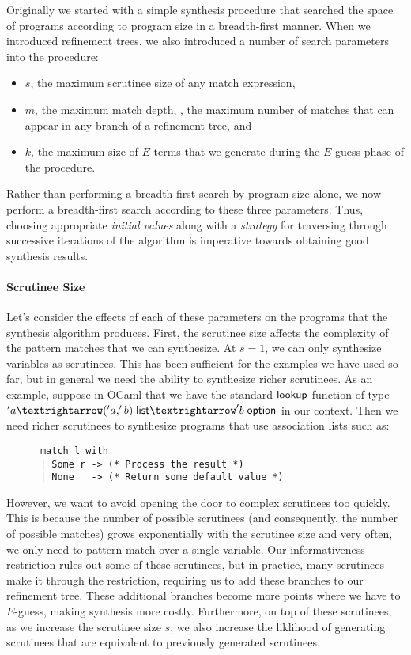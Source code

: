 Originally we started with a simple synthesis procedure that searched the space of programs according to program size in a breadth-first manner.
When we introduced refinement trees, we also introduced a number of search parameters into the procedure:
\begin{itemize}
  \item $s$, the maximum scrutinee size of any match expression,
  \item $m$, the maximum match depth, \ie, the maximum number of matches that can appear in any branch of a refinement tree, and
  \item $k$, the maximum size of $E$-terms that we generate during the $E$-guess phase of the procedure.
\end{itemize}
Rather than performing a breadth-first search by program size alone, we now perform a breadth-first search according to these three parameters.
Thus, choosing appropriate \emph{initial values} along with a \emph{strategy} for traversing through successive iterations of the algorithm is imperative towards obtaining good synthesis results.

\paragraph{Scrutinee Size}
Let's consider the effects of each of these parameters on the programs that the synthesis algorithm produces.
First, the scrutinee size affects the complexity of the pattern matches that we can synthesize.
At $s = 1$, we can only synthesize variables as scrutinees.
This has been sufficient for the examples we have used so far, but in general we need the ability to synthesize richer scrutinees.
As an example, suppose in OCaml that we have the standard $\mathsf{lookup}$ function of type $'a → ('a, 'b)\;\mlist → 'b\;\mkwd{option}$ in our context.
Then we need richer scrutinees to synthesize programs that use association lists such as:

\begin{center}
  \begin{minipage}{0.75\textwidth}
    \begin{lstlisting}
      match l with
      | Some r -> (* Process the result *)
      | None   -> (* Return some default value *)
    \end{lstlisting}
  \end{minipage}
\end{center}

However, we want to avoid opening the door to complex scrutinees too quickly.
This is because the number of possible scrutinees (and consequently, the number of possible matches) grows exponentially with the scrutinee size and very often, we only need to pattern match over a single variable.
Our informativeness restriction rules out some of these scrutinees, but in practice, many scrutinees make it through the restriction, requiring us to add these branches to our refinement tree.
These additional branches become more points where we have to $E$-guess, making synthesis more costly.
Furthermore, on top of these scrutinees, as we increase the scrutinee size $s$, we also increase the liklihood of generating scrutinees that are equivalent to previously generated scrutinees.

